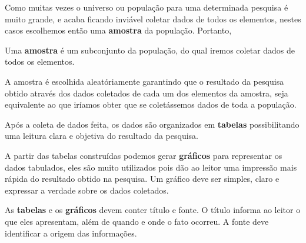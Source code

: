  Como muitas vezes o universo ou população para uma determinada pesquisa é muito grande, e acaba ficando inviável coletar dados de todos os elementos, nestes casos escolhemos então uma \textbf{amostra} da população. Portanto,

  \vskip0.3cm
 \colorbox{azul}{
 \begin{minipage}{13cm}
 \begin{center}
  Uma \textbf{amostra} é um subconjunto da população, do qual iremos coletar dados de todos os elementos.
 \end{center}
 \end{minipage}}
 \vskip0.3cm

 A amostra é escolhida aleatóriamente garantindo que o resultado da pesquisa obtido através dos dados coletados de cada um dos elementos da amostra, seja equivalente ao que iríamos obter que se coletássemos dados de toda a população.

 Após a coleta de dados feita, os dados são organizados em \textbf{tabelas} possibilitando uma leitura clara e objetiva do resultado da pesquisa.

 A partir das tabelas construídas podemos gerar \textbf{gráficos} para representar os dados tabulados, eles são muito utilizados pois dão ao leitor uma impressão mais rápida do resultado obtido na pesquisa. Um gráfico deve ser simples, claro e expressar a verdade sobre os dados coletados.


   \vskip0.3cm
 \colorbox{amarelo}{
 \begin{minipage}{13cm}
 \begin{center}
  As \textbf{tabelas} e os \textbf{gráficos} devem conter título e fonte. O título informa ao leitor o que eles apresentam, além de quando e onde o fato ocorreu. A fonte deve identificar a origem das informações.
 \end{center}
 \end{minipage}}
 \vskip0.3cm

